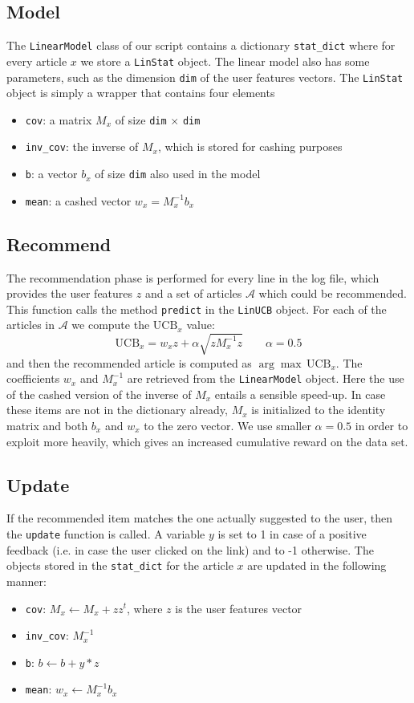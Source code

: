 \documentclass[a4paper, 11pt]{article}
\begin{document}
\subsection{Model}
The \verb!LinearModel! class of our script contains a dictionary \verb!stat_dict! where for every article $x$ we store a \verb!LinStat! object. The linear model also has some parameters, such as the dimension \verb!dim! of the user features vectors. The \verb!LinStat! object is simply a wrapper that contains four elements
\begin{itemize}
\item \verb!cov!: a matrix $M_x$ of size \verb!dim! $\times$ \verb!dim!
\item \verb!inv_cov!: the inverse of $M_x$, which is stored for cashing purposes
\item \verb!b!: a vector $b_x$ of size \verb!dim! also used in the model
\item \verb!mean!: a cashed vector $w_x = M_x^{-1}b_x$
\end{itemize}

\subsection{Recommend}
The recommendation phase is performed for every line in the log file, which provides the user features $z$ and a set of articles $\mathcal{A}$ which could be recommended. This function calls the method \verb!predict! in the \verb!LinUCB! object. For each of the articles in $\mathcal{A}$ we compute the $ \text{UCB}_x$ value:
\begin{equation}
\text{UCB}_x = w_xz + \alpha \sqrt{zM_x^{-1}z} \qquad \alpha=0.5
\end{equation}
and then the recommended article is computed as $\arg\max \, \text{UCB}_x$. The coefficients $w_x$ and $M_x^{-1}$ are retrieved from the \verb!LinearModel! object. Here the use of the cashed version of the inverse of $M_x$ entails a sensible speed-up. In case these items are not in the dictionary already, $M_x$ is initialized to the identity matrix and both $b_x$ and $w_x$ to the zero vector. We use smaller $\alpha=0.5$ in order to exploit more heavily, which gives an increased cumulative reward on the data set.

\subsection{Update}
If the recommended item matches the one actually suggested to the user, then the \verb!update! function is called. A variable $y$ is set to 1 in case of a positive feedback (i.e. in case the user clicked on the link) and to -1 otherwise.
The objects stored in the \verb!stat_dict! for the article $x$ are updated in the following manner:
\begin{itemize}
\item \verb!cov!: $M_x \leftarrow M_x+ zz^t$, where $z$ is the user features vector
\item \verb!inv_cov!: $M_x^{-1}$
\item \verb!b!: $b \leftarrow b + y*z$
\item \verb!mean!: $w_x \leftarrow M_x^{-1}b_x$
\end{itemize}
\end{document}

